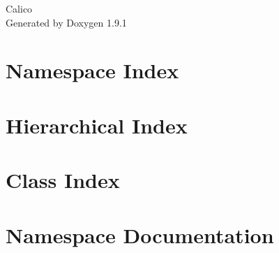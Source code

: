 \let\mypdfximage\pdfximage\def\pdfximage{\immediate\mypdfximage}\documentclass[twoside]{book}
\newcommand{\+}{\discretionary{\mbox{\scriptsize$\hookleftarrow$}}{}{}}
\newcommand{\clearemptydoublepage}{%
  \newpage{\pagestyle{empty}\cleardoublepage}%
}
\begin{document}
\raggedbottom

\hypersetup{pageanchor=false,
             bookmarksnumbered=true,
             pdfencoding=unicode
            }
\begin{titlepage}
\vspace*{7cm}
\begin{center}%
{\Large Calico }\\
\vspace*{1cm}
{\large Generated by Doxygen 1.9.1}\\
\end{center}
\end{titlepage}
\clearemptydoublepage
{}
\tableofcontents
\clearemptydoublepage
{}
\hypersetup{pageanchor=true}

\chapter{Namespace Index}

\chapter{Hierarchical Index}

\chapter{Class Index}

\chapter{Namespace Documentation}





\end{document}
